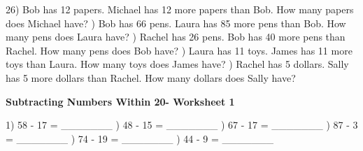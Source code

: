\documentclass{article}%
\begin{document}
26) Bob has 12 papers. Michael has 12 more papers than Bob. How many papers does Michael have?%
\newline%
\newline%
) Bob has 66 pens. Laura has 85 more pens than Bob. How many pens does Laura have?%
\newline%
\newline%
) Rachel has 26 pens. Bob has 40 more pens than Rachel. How many pens does Bob have?%
\newline%
\newline%
) Laura has 11 toys. James has 11 more toys than Laura. How many toys does James have?%
\newline%
\newline%
) Rachel has 5 dollars. Sally has 5 more dollars than Rachel. How many dollars does Sally have?%
\newline%
\newline%
\newline%
\pagebreak%
\large%
\begin{center}%
\textbf{Subtracting Numbers Within 20- Worksheet 1}%
\newline%
\newline%
\newline%
\end{center} \normalsize%
1) 58 {-} 17 = \_\_\_\_\_\_\_%
\newline%
\newline%
) 48 {-} 15 = \_\_\_\_\_\_\_%
\newline%
\newline%
) 67 {-} 17 = \_\_\_\_\_\_\_%
\newline%
\newline%
) 87 {-} 3 = \_\_\_\_\_\_\_%
\newline%
\newline%
) 74 {-} 19 = \_\_\_\_\_\_\_%
\newline%
\newline%
) 44 {-} 9 = \_\_\_\_\_\_\_%
\newline%
\newline%
\newline%
\end{document}
